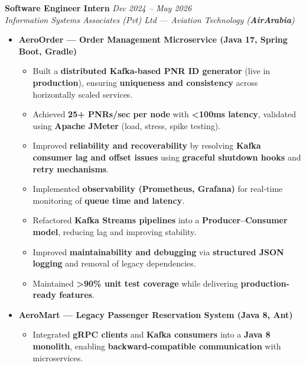 \noindent
\textbf{Software Engineer Intern} \hfill \textit{Dec 2024 -- May 2026}\\
\textit{Information Systems Associates (Pvt) Ltd --- Aviation Technology (\textbf{AirArabia})}\\[0.05em]

\begin{itemize}[leftmargin=*, itemsep=0.3em, topsep=0.05em]

    \item \textbf{AeroOrder --- Order Management Microservice (Java 17, Spring Boot, Gradle)}
    \begin{itemize}[leftmargin=1.5em, itemsep=0.12em]
        \item Built a \textbf{distributed Kafka-based PNR ID generator} (live in \textbf{production}), ensuring \textbf{uniqueness and consistency} across horizontally scaled services.
        
        \item Achieved \textbf{25+ PNRs/sec per node} with \textbf{<100ms latency}, validated using \textbf{Apache JMeter} (load, stress, spike testing).
        
        \item Improved \textbf{reliability and recoverability} by resolving \textbf{Kafka consumer lag and offset issues} using \textbf{graceful shutdown hooks} and \textbf{retry mechanisms}.
        
        \item Implemented \textbf{observability (Prometheus, Grafana)} for real-time monitoring of \textbf{queue time and latency}.
        
        \item Refactored \textbf{Kafka Streams pipelines} into a \textbf{Producer–Consumer model}, reducing lag and improving stability.
        
        \item Improved \textbf{maintainability and debugging} via \textbf{structured JSON logging} and removal of legacy dependencies.
        
        \item Maintained \textbf{>90\% unit test coverage} while delivering \textbf{production-ready features}.
    \end{itemize}

    \item \textbf{AeroMart --- Legacy Passenger Reservation System (Java 8, Ant)}
    \begin{itemize}[leftmargin=1.5em, itemsep=0.12em]
        \item Integrated \textbf{gRPC clients} and \textbf{Kafka consumers} into a \textbf{Java 8 monolith}, enabling \textbf{backward-compatible communication} with microservices.
        

\end{itemize}
\end{itemize}
